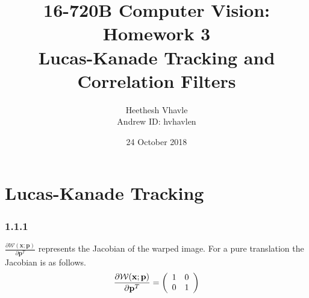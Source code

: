 \documentclass[a4paper]{article}
\title{16-720B Computer Vision: Homework 3 \\
Lucas-Kanade Tracking and Correlation Filters}
\author{Heethesh Vhavle\\
Andrew ID: hvhavlen}
\date{24 October 2018}
\begin{document}
\maketitle

\section{Lucas-Kanade Tracking}
\subsubsection*{1.1.1}
$\frac { \partial \mathcal { W } ( \mathbf { x } ; \mathbf { p } ) } { \partial \mathbf { p } ^ { T } }$ represents the Jacobian of the warped image. For a pure translation the Jacobian is as follows.
\begin{gather}
    \frac { \partial \mathcal { W } ( \mathbf { x } ; \mathbf { p } ) } { \partial \mathbf { p } ^ { T } } = \left( \begin{array} { l l l l } { 1 } & { 0 } \\ { 0 } & { 1 } \end{array} \right)
\end{gather}
\end{document}
